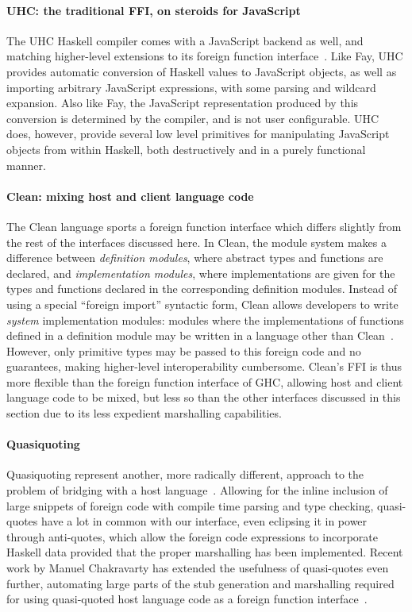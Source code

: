 \documentclass[preprint]{sigplanconf}
\begin{document}
\paragraph{UHC: the traditional FFI, on steroids for JavaScript}
The UHC Haskell compiler comes with a JavaScript backend as well, and matching
higher-level extensions to its foreign function interface\ \cite{uhc}.
Like Fay, UHC provides automatic conversion of Haskell values to JavaScript
objects, as well as importing arbitrary JavaScript expressions, with some
parsing and wildcard expansion.
Also like Fay, the JavaScript representation produced by this
conversion is determined by the compiler, and is not user configurable.
UHC does, however, provide several low level primitives for manipulating
JavaScript objects from within Haskell, both destructively and in a purely
functional manner.

\paragraph{Clean: mixing host and client language code}
The Clean language sports a foreign function interface which differs slightly
from the rest of the interfaces discussed here. In Clean, the module system
makes a difference between \emph{definition modules}, where abstract types and
functions are declared, and \emph{implementation modules}, where implementations
are given for the types and functions declared in the corresponding definition
modules.
Instead of using a special ``foreign import'' syntactic form, Clean allows
developers to write \emph{system} implementation modules: modules where the
implementations of functions defined in a definition module may be written in
a language other than Clean\ \cite{clean}. However, only primitive types may
be passed to this foreign code and no guarantees, making higher-level
interoperability cumbersome.
Clean's FFI is thus more flexible than the foreign function interface of GHC,
allowing host and client language code to be mixed, but less so than the other
interfaces discussed in this section due to its less expedient marshalling
capabilities.

\paragraph{Quasiquoting}
Quasiquoting represent another, more radically different, approach to the
problem of bridging with a host language\ \cite{quasiquotes}.
Allowing for the inline inclusion of large snippets of foreign code with
compile time parsing and type checking,
quasi-quotes have a lot in common with our interface, even eclipsing it in
power through anti-quotes, which allow the foreign code expressions to
incorporate Haskell data provided that the proper marshalling has been
implemented. Recent work by Manuel Chakravarty has extended the usefulness of
quasi-quotes even further, automating large parts of the stub generation
and marshalling required for using quasi-quoted host language code as a
foreign function interface\ \cite{language-c-inline}.
\end{document}
